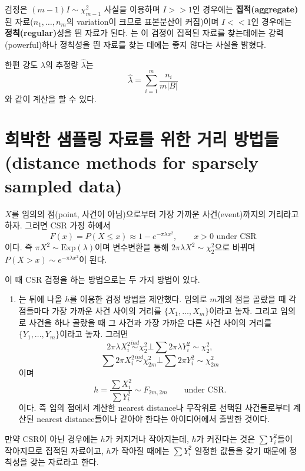 \documentclass[b5paper,]{scrbook}
\providecommand{\tightlist}{%
  \setlength{\itemsep}{0pt}\setlength{\parskip}{0pt}}
\theoremstyle{plain}
\theoremstyle{definition}
\numberwithin{equation}{section}
\begin{document}
검정은 \((m-1)I \sim \chi_{m-1}^{2}\) 사실을 이용하며 \(I >> 1\)인 경우에는 \textbf{집적(aggregate)}된 자료(\(n_{1}, \ldots, n_{m}\)의 variation이 크므로 표본분산이 커짐)이며 \(I << 1\)인 경우에는 \textbf{정칙(regular)}성을 띈 자료가 된다. \citep{Diggle1979}는 이 검정이 집적된 자료를 찾는데에는 강력(powerful)하나 정칙성을 띈 자료를 찾는 데에는 좋지 않다는 사실을 밝혔다.

한편 강도 \(\lambda\)의 추정량 \(\hat{\lambda}\)는
\[\hat{\lambda}=\sum_{i=1}^{m}\frac{n_{i}}{m|B|}\]
와 같이 계산을 할 수 있다.

\hypertarget{-----distance-methods-for-sparsely-sampled-data}{%
\section{희박한 샘플링 자료를 위한 거리 방법들(distance methods for sparsely sampled data)}\label{-----distance-methods-for-sparsely-sampled-data}}

\(X\)를 임의의 점(point, 사건이 아님)으로부터 가장 가까운 사건(event)까지의 거리라고 하자. 그러면 CSR 가정 하에서
\[F(x)=P(X\leq x)\approx 1-e^{-\pi\lambda x^{2}}, \qquad{x>0\text{ under CSR}}\]
이다. 즉 \(\pi X^{2} \sim \text{Exp}(\lambda)\)이며 변수변환을 통해 \(2\pi \lambda X^{2} \sim \chi_{2}^{2}\)으로 바뀌며 \(P(X>x)\sim e^{-\pi\lambda x^{2}}\)이 된다.

이 때 CSR 검정을 하는 방법으로는 두 가지 방법이 있다.

\begin{enumerate}
\def\labelenumi{\arabic{enumi}.}
\tightlist
\item
  \citep{Hopkins1954}는 뒤에 나올 \(h\)를 이용한 검정 방법을 제안했다. 임의로 \(m\)개의 점을 골랐을 때 각 점들마다 가장 가까운 사건 사이의 거리를 \(\{X_{1}, \ldots, X_{m}\}\)이라고 놓자. 그리고 임의로 사건을 하나 골랐을 때 그 사건과 가장 가까운 다른 사건 사이의 거리를 \(\{Y_{1}, \ldots, Y_{m}\}\)이라고 놓자. 그러면
  \[2\pi\lambda X_{i}^{2} \stackrel{ind}{\sim} \chi_{2}^{2} \bot \sum 2\pi\lambda Y_{i}^{2} \sim \chi_{2}^{2},\]
  \[\sum 2\pi X_{i}^{2} \stackrel{ind}{\sim} \chi_{2m}^{2} \bot \sum 2\pi Y_{i}^{2} \sim \chi_{2m}^{2}\]
  이며
  \[h=\frac{\sum X_{i}^{2}}{\sum Y_{i}^{2}} \sim F_{2m,2m} \qquad{\text{under CSR.}}\]
  이다. 즉 임의 점에서 계산한 nearest distance나 무작위로 선택된 사건들로부터 계산된 nearest distance들이나 같아야 한다는 아이디어에서 출발한 것이다.
\end{enumerate}

만약 CSR이 아닌 경우에는 \(h\)가 커지거나 작아지는데, \(h\)가 커진다는 것은 \(\sum Y_{i}^{2}\)들이 작아지므로 집적된 자료이고, \(h\)가 작아질 때에는 \(\sum Y_{i}^{2}\) 일정한 값들을 갖기 때문에 정칙성을 갖는 자료라고 한다.
\end{document}
